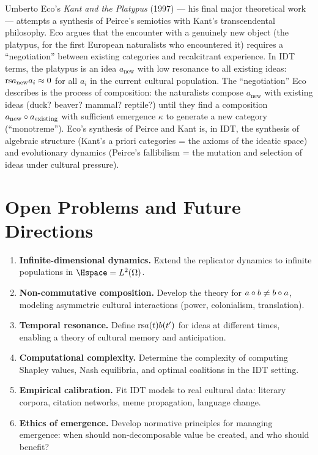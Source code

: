 \begin{interpretation}
Umberto Eco's \textit{Kant and the Platypus} (1997) --- his final major
theoretical work --- attempts a synthesis of Peirce's semiotics with
Kant's transcendental philosophy.  Eco argues that the encounter with
a genuinely new object (the platypus, for the first European naturalists
who encountered it) requires a ``negotiation'' between existing
categories and recalcitrant experience.  In IDT terms, the platypus is
an idea $a_{\text{new}}$ with low resonance to all existing ideas:
$\mathrm{rs}{a_{\text{new}}}{a_i} \approx 0$ for all $a_i$ in the current cultural
population.  The ``negotiation'' Eco describes is the process of
composition: the naturalists compose $a_{\text{new}}$ with existing
ideas (duck? beaver? mammal? reptile?) until they find a composition
$a_{\text{new}} \circ a_{\text{existing}}$ with sufficient emergence
$\kappa$ to generate a new category (``monotreme'').  Eco's synthesis
of Peirce and Kant is, in IDT, the synthesis of algebraic structure
(Kant's a priori categories = the axioms of the ideatic space) and
evolutionary dynamics (Peirce's fallibilism = the mutation and selection
of ideas under cultural pressure).
\end{interpretation}

\section{Open Problems and Future Directions}

\begin{enumerate}
\item \textbf{Infinite-dimensional dynamics.}
  Extend the replicator dynamics to infinite populations in
  $\Hspace = L^2(\Omega)$.

\item \textbf{Non-commutative composition.}
  Develop the theory for $a \circ b \neq b \circ a$, modeling
  asymmetric cultural interactions (power, colonialism, translation).

\item \textbf{Temporal resonance.}
  Define $\mathrm{rs}{a(t)}{b(t')}$ for ideas at different times, enabling a
  theory of cultural memory and anticipation.

\item \textbf{Computational complexity.}
  Determine the complexity of computing Shapley values, Nash equilibria,
  and optimal coalitions in the IDT setting.

\item \textbf{Empirical calibration.}
  Fit IDT models to real cultural data: literary corpora, citation
  networks, meme propagation, language change.

\item \textbf{Ethics of emergence.}
  Develop normative principles for managing emergence: when should
  non-decomposable value be created, and who should benefit?
\end{enumerate}

